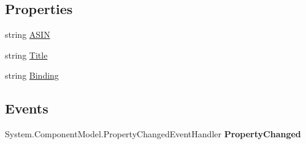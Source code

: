 \subsection*{Properties}
\begin{DoxyCompactItemize}
\item 
\hypertarget{class_amazon___price___finder_1_1amazon_1_1ecs_1_1_item_alternate_version_afc59bc66c66cd7c974b8617a909e7a58}{string \hyperlink{class_amazon___price___finder_1_1amazon_1_1ecs_1_1_item_alternate_version_afc59bc66c66cd7c974b8617a909e7a58}{A\-S\-I\-N}}\label{class_amazon___price___finder_1_1amazon_1_1ecs_1_1_item_alternate_version_afc59bc66c66cd7c974b8617a909e7a58}

\begin{DoxyCompactList}\small\item\em \end{DoxyCompactList}\item 
\hypertarget{class_amazon___price___finder_1_1amazon_1_1ecs_1_1_item_alternate_version_ac7167d79750d4a6185952b7b423abc4c}{string \hyperlink{class_amazon___price___finder_1_1amazon_1_1ecs_1_1_item_alternate_version_ac7167d79750d4a6185952b7b423abc4c}{Title}}\label{class_amazon___price___finder_1_1amazon_1_1ecs_1_1_item_alternate_version_ac7167d79750d4a6185952b7b423abc4c}

\begin{DoxyCompactList}\small\item\em \end{DoxyCompactList}\item 
\hypertarget{class_amazon___price___finder_1_1amazon_1_1ecs_1_1_item_alternate_version_ab75417ff9344b7ee620929bc7daacaa4}{string \hyperlink{class_amazon___price___finder_1_1amazon_1_1ecs_1_1_item_alternate_version_ab75417ff9344b7ee620929bc7daacaa4}{Binding}}\label{class_amazon___price___finder_1_1amazon_1_1ecs_1_1_item_alternate_version_ab75417ff9344b7ee620929bc7daacaa4}

\begin{DoxyCompactList}\small\item\em \end{DoxyCompactList}\end{DoxyCompactItemize}
\subsection*{Events}
\begin{DoxyCompactItemize}
\item 
\hypertarget{class_amazon___price___finder_1_1amazon_1_1ecs_1_1_item_alternate_version_a207063368c8d652d06686f550a312975}{System.\-Component\-Model.\-Property\-Changed\-Event\-Handler {\bfseries Property\-Changed}}\label{class_amazon___price___finder_1_1amazon_1_1ecs_1_1_item_alternate_version_a207063368c8d652d06686f550a312975}

\end{DoxyCompactItemize}


